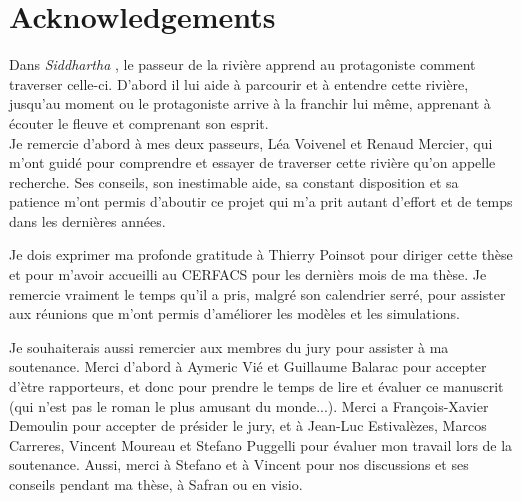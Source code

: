 \chapter*{Acknowledgements}
    
Dans \textsl{Siddhartha} , le passeur de la rivière apprend au protagoniste comment traverser celle-ci. D'abord il lui aide à parcourir et à entendre cette rivière, jusqu'au moment ou le protagoniste arrive à la franchir lui même, apprenant à écouter le fleuve et comprenant son esprit. \\  %
%
Je remercie d'abord à mes deux passeurs, Léa Voivenel et Renaud Mercier, qui m'ont guidé pour comprendre et essayer de traverser cette rivière qu'on appelle recherche. Ses conseils, son inestimable aide, sa constant disposition et sa patience m'ont permis d'aboutir ce projet qui m'a prit autant d'effort et de temps dans les dernières années.

Je dois exprimer ma profonde gratitude à Thierry Poinsot pour diriger cette thèse et pour m'avoir accueilli au CERFACS pour les dernièrs mois de ma thèse. Je remercie vraiment le temps qu'il a pris, malgré son calendrier serré, pour assister aux réunions que m'ont permis d'améliorer les modèles et les simulations.

Je souhaiterais aussi remercier aux membres du jury pour assister à ma soutenance. Merci d'abord à Aymeric Vié et Guillaume Balarac pour accepter d'ètre rapporteurs, et donc pour prendre le temps de lire et évaluer ce manuscrit (qui n'est pas le roman le plus amusant du monde...).  Merci a François-Xavier Demoulin pour accepter de présider le jury, et à Jean-Luc Estivalèzes, Marcos Carreres, Vincent Moureau et Stefano Puggelli pour évaluer mon travail lors de la soutenance. Aussi, merci à Stefano et à Vincent pour nos discussions et ses conseils pendant ma thèse, à Safran ou en visio. 

